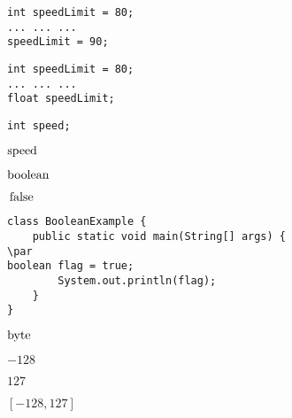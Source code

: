 \documentclass{book}
\def\lthtmlcheckvsize{\ifdim\ht\sizebox<\vsize 
  \ifdim\wd\sizebox<\hsize\expandafter\hfill\fi \expandafter\vfill
  \else\expandafter\vss\fi}%
\begin{document}
{\newpage\clearpage
{}%
\begin{lstlisting}
int speedLimit = 80;
... ... ...
speedLimit = 90; 
\end{lstlisting}%
\lthtmlfigureZ
\lthtmlcheckvsize\clearpage}

{\newpage\clearpage
{}%
\begin{lstlisting}
int speedLimit = 80;
... ... ...
float speedLimit;
\end{lstlisting}%
\lthtmlfigureZ
\lthtmlcheckvsize\clearpage}

{\newpage\clearpage
{}%
\begin{lstlisting}
int speed;
\end{lstlisting}%
\lthtmlfigureZ
\lthtmlcheckvsize\clearpage}

{\newpage\clearpage
{}%
$\lstinline{speed}$%
\lthtmlindisplaymathZ
\lthtmlcheckvsize\clearpage}

{\newpage\clearpage
{}%
$\lstinline{boolean}$%
\lthtmlindisplaymathZ
\lthtmlcheckvsize\clearpage}

{\newpage\clearpage
{}%
$\lstinline{false}$%
\lthtmlindisplaymathZ
\lthtmlcheckvsize\clearpage}

{\newpage\clearpage
{}%
\begin{lstlisting}
class BooleanExample {
    public static void main(String[] args) {
\par
boolean flag = true;
        System.out.println(flag);
    }
}
\end{lstlisting}%
\lthtmlfigureZ
\lthtmlcheckvsize\clearpage}

{\newpage\clearpage
{}%
$\lstinline{byte}$%
\lthtmlindisplaymathZ
\lthtmlcheckvsize\clearpage}

{\newpage\clearpage
{}%
$-128$%
\lthtmlindisplaymathZ
\lthtmlcheckvsize\clearpage}

{\newpage\clearpage
{}%
$127$%
\lthtmlindisplaymathZ
\lthtmlcheckvsize\clearpage}

{\newpage\clearpage
{}%
$[-128, 127]$%
\lthtmlindisplaymathZ
\lthtmlcheckvsize\clearpage}
\end{document}

